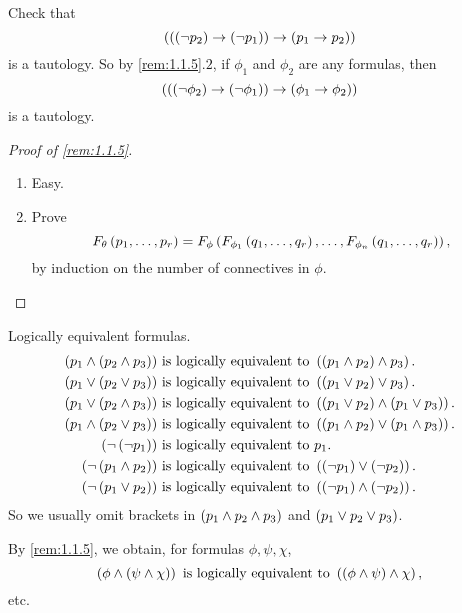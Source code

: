 \pagebreak

\begin{example1}
Check that
$$ \left( \left( \left( \neg p_2 \right) \rightarrow \left( \neg p_1 \right) \right) \rightarrow \left( p_1 \rightarrow p_2 \right) \right) $$
is a tautology. So by \ref{rem:1.1.5}.$ 2 $, if $ \phi_1 $ and $ \phi_2 $ are any formulas, then
$$ \left( \left( \left( \neg \phi_2 \right) \rightarrow \left( \neg \phi_1 \right) \right) \rightarrow \left( \phi_1 \rightarrow \phi_2 \right) \right) $$
is a tautology.
\end{example1}

\begin{proof}[Proof of \ref{rem:1.1.5}]
\hfill
\begin{enumerate}
\item Easy.
\item Prove
$$ F_\theta\left( p_1, \dots, p_r \right) = F_\phi\left( F_{\phi_1}\left( q_1, \dots, q_r \right), \dots, F_{\phi_n}\left( q_1, \dots, q_r \right) \right), $$
by induction on the number of connectives in $ \phi $.
\end{enumerate}
\end{proof}

\begin{example2}
Logically equivalent formulas.
\begin{align*}
\andb{p_1}{\andb{p_2}{p_3}} \ & \text{is logically equivalent to} \ \andb{\andb{p_1}{p_2}}{p_3}. \\
\orb{p_1}{\orb{p_2}{p_3}} \ & \text{is logically equivalent to} \ \orb{\orb{p_1}{p_2}}{p_3}. \\
\orb{p_1}{\andb{p_2}{p_3}} \ & \text{is logically equivalent to} \ \andb{\orb{p_1}{p_2}}{\orb{p_1}{p_3}}. \\
\andb{p_1}{\orb{p_2}{p_3}} \ & \text{is logically equivalent to} \ \orb{\andb{p_1}{p_2}}{\andb{p_1}{p_3}}. \\
\notb{\notb{p_1}} \ & \text{is logically equivalent to} \ p_1. \\
\notb{\andb{p_1}{p_2}} \ & \text{is logically equivalent to} \ \orb{\notb{p_1}}{\notb{p_2}}. \\
\notb{\orb{p_1}{p_2}} \ & \text{is logically equivalent to} \ \andb{\notb{p_1}}{\notb{p_2}}.
\end{align*}
So we usually omit brackets in $ \left( p_1 \land p_2 \land p_3 \right) $ and $ \left( p_1 \lor p_2 \lor p_3 \right) $.
\end{example2}

\begin{note}
By \ref{rem:1.1.5}, we obtain, for formulas $ \phi, \psi, \chi $,
$$ \left( \phi \land \left( \psi \land \chi \right) \right) \ \text{is logically equivalent to} \ \left( \left( \phi \land \psi \right) \land \chi \right), $$
etc.
\end{note}

